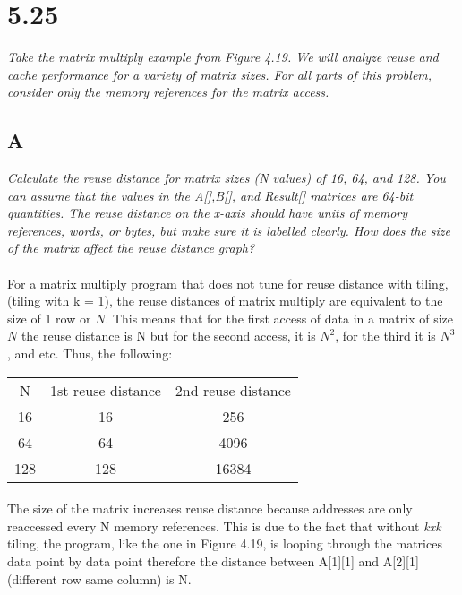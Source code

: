 \documentclass[10pt]{article}
\begin{document}
\paragraph{} 

\section{5.25}
\textit{Take the matrix multiply example from Figure 4.19. We will analyze reuse and
cache performance for a variety of matrix sizes. For all parts of this problem, consider
only the memory references for the matrix access.}
\subsection{A}
\textit{Calculate the reuse distance for matrix sizes (N values) of 16, 64, and 128. You can
assume that the values in the A[],B[], and Result[] matrices are 64-bit quantities. The
reuse distance on the x-axis should have units of memory references, words, or bytes,
but make sure it is labelled clearly. How does the size of the matrix affect the reuse
distance graph?}
\paragraph{} For a matrix multiply program that does not tune for reuse distance with tiling, (tiling with k = 1),
the reuse distances of matrix multiply are equivalent to the size of 1 row or $N$. This means that for the first access of 
data in a matrix of size $N$ the reuse distance is N but for the second access, it is $N^2$, for the third it is $N^3$, and etc. 
Thus, the following:

\begin{tabular}{c|c|c}
    N & 1st reuse distance & 2nd reuse distance \\
    16 & 16 & 256 \\
    64 & 64 & 4096 \\
    128 & 128 & 16384 \\
\end{tabular}

\paragraph{} The size of the matrix increases reuse distance because addresses are only reaccessed every N memory references. This is 
due to the fact that without \textit{kxk} tiling, the program, like the one in Figure 4.19, is looping through the matrices data point by data point
therefore the distance between A[1][1] and A[2][1] (different row same column) is N. 
\end{document}
